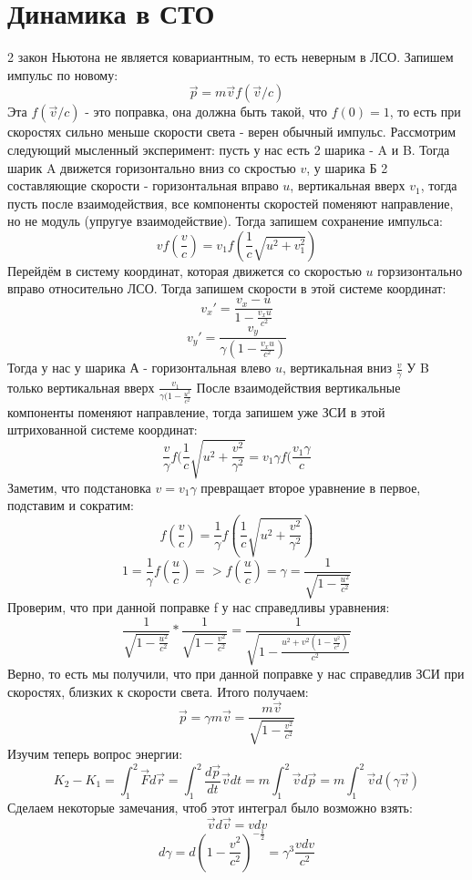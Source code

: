 \section{Динамика в СТО}
2 закон Ньютона не является ковариантным, то есть неверным в ЛСО.
Запишем импульс по новому:
\[\Vec{p} = m\Vec{v}f(\Vec{v}/c)\]
Эта $f(\Vec{v}/c)$ - это поправка, она должна быть такой, что $f(0) = 1$, то есть при скоростях сильно меньше скорости света - верен обычный импульс.
Рассмотрим следующий мысленный эксперимент: пусть у нас есть 2 шарика - A и B. Тогда шарик A движется горизонтально вниз со скростью $v$, у шарика Б 2 составляющие скорости - горизонтальная вправо $u$, вертикальная вверх $v_1$, тогда пусть после взаимодействия, все компоненты скоростей поменяют направление, но не модуль (упругуе взаимодействие).
Тогда запишем сохранение импульса:
\[vf(\frac{v}{c}) = v_1f(\frac{1}{c}\sqrt{u^2+v_1^2})\]
Перейдём в систему координат, которая движется со скоростью $u$ горзизонтально вправо относительно ЛСО.
Тогда запишем скорости в этой системе координат:
\[v_x' = \frac{v_x - u}{1 - \frac{v_xu}{c^2}}\]
\[v_y' = \frac{v_y}{\gamma(1 - \frac{v_xu}{c^2})}\]
Тогда у нас у шарика А - горизонтальная влево $u$, вертикальная вниз $\frac{v}{\gamma}$
У B только вертикальная вверх $\frac{v_1}{\gamma(1 - \frac{u^2}{c^2}}$
После взаимодействия вертикальные компоненты поменяют направление, тогда запишем уже ЗСИ в этой штрихованной системе координат:
\[\frac{v}{\gamma}f(\frac{1}{c}\sqrt{u^2 + \frac{v^2}{\gamma^2}} = v_1\gamma f(\frac{v_1\gamma}{c}\]
Заметим, что подстановка $v = v_1\gamma$ превращает второе уравнение в первое, подставим и сократим:
\[f(\frac{v}{c}) = \frac{1}{\gamma} f (\frac{1}{c}\sqrt{u^2 + \frac{v^2}{\gamma^2}})\]
\[1 = \frac{1}{\gamma} f (\frac{u}{c}) => f(\frac{u}{c}) = \gamma = \frac{1}{\sqrt{1 - \frac{u^2}{c^2}}}\]
Проверим, что при данной поправке f у нас справедливы уравнения:
\[\frac{1}{\sqrt{1 - \frac{u^2}{c^2}}} * \frac{1}{\sqrt{1 - \frac{v^2}{c^2}}} = \frac{1}{\sqrt{1 - \frac{u^2 + v^2(1 - \frac{u^2}{c^2})}{c^2}}}\]
Верно, то есть мы получили, что при данной поправке у нас справедлив ЗСИ при скоростях, близких к скорости света. Итого получаем:
\[\Vec{p} = \gamma m \Vec{v} = \frac{m\Vec{v}}{\sqrt{1 - \frac{v^2}{c^2}}}\]
Изучим теперь вопрос энергии:
\[K_2 - K_1 = \int_1^2 \Vec{F}d\Vec{r} = \int_1^2 \frac{d\Vec{p}}{dt}\Vec{v}dt = m\int_1^2 \Vec{v}d\Vec{p} = m \int_1^2 \Vec{v}d(\gamma \Vec{v})\]
Сделаем некоторые замечания, чтоб этот интеграл было возможно взять:
\[\Vec{v}d\Vec{v} = vdv\]
\[d\gamma = d(1 - \frac{v^2}{c^2})^{-\frac{1}{2}} = \gamma^3 \frac{vdv}{c^2}\]
